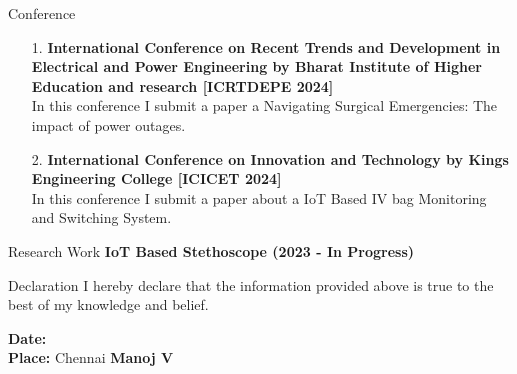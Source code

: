 \documentclass{resume}
\begin{document}
\begin{rSection}{Conference}

\begin{itemize}
    \item[1.] \textbf{International Conference on Recent Trends and Development in Electrical and Power Engineering by Bharat Institute of Higher Education and research [ICRTDEPE 2024]}\\
    In this conference I submit a paper a Navigating Surgical Emergencies: The impact of power outages.
    \item[2.] \textbf{International Conference on Innovation and Technology by Kings Engineering College [ICICET 2024]}\\
    In this conference I submit a paper about a IoT Based IV bag Monitoring and Switching System.
\end{itemize}
\end{rSection}


\begin{rSection}{Research Work}
{\bf IoT Based Stethoscope (2023 - In Progress)}\\

\end{rSection}

\begin{rSection}{Declaration}
    I hereby declare that the information provided above is true to the best of my knowledge and belief.
\end{rSection}



\vspace{2cm}

\noindent\textbf{Date:}\\ 

\textbf{Place:} Chennai \hfill{\bf Manoj V}



\end{document}
